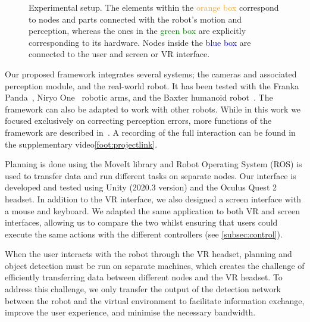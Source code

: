 \documentclass[letterpaper, 10 pt, conference]{ieeeconf}  %
\begin{document}
\begin{figure}[b]
{\begin{tikzpicture}


        
\end{tikzpicture}
    }
        \caption{Experimental setup. The elements within the \textcolor{orange}{orange box} correspond to nodes and parts connected with the robot's motion and perception, whereas the ones in the \textcolor{green}{green box} are explicitly corresponding to its hardware. Nodes inside the \textcolor{blue}{blue box} are connected to the user and screen or VR interface.}
        \label{fig:pipeline}
        
\end{figure}

Our proposed framework integrates several systems; the cameras and associated perception module, and the real-world robot. It has been tested with the Franka Panda~\cite{wozniak2023you}, Niryo One~\cite{wozniakvirtual} robotic arms, and the Baxter humanoid robot~\cite{moletta2023virtual}. The framework can also be adapted to work with other robots. While in this work we focused exclusively on correcting perception errors, more functions of the framework are described in~\cite{wozniak2023you,wozniakvirtual}. A recording of the full interaction can be found in the supplementary video\cref{foot:projectlink}.

Planning is done using the MoveIt library and Robot Operating System (ROS) is used to transfer data and run different tasks on separate nodes. Our interface is developed and tested using Unity (2020.3 version) and the Oculus Quest 2 headset. In addition to the VR interface, we also designed a screen interface with a mouse and keyboard. We adapted the same application to both VR and screen interfaces, allowing us to compare the two whilst ensuring that users could execute the same actions with the different controllers (see \cref{subsec:control}).

When the user interacts with the robot through the VR headset, planning and object detection must be run on separate machines, which creates the challenge of efficiently transferring data between different nodes and the VR headset. To address this challenge, we only transfer the output of the detection network between the robot and the virtual environment to facilitate information exchange, improve the user experience, and minimise the necessary bandwidth. 
\end{document}
